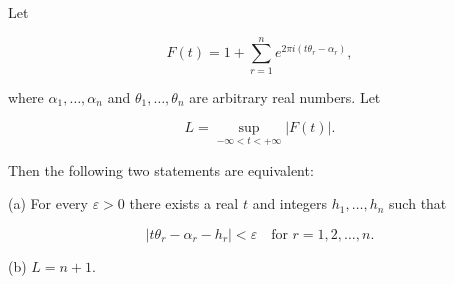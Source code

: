Let

$$F(t) = 1 + \sum_{r=1}^{n} e^{2\pi i(t\theta_r - \alpha_r)},$$

where $\alpha_1, \ldots, \alpha_n$ and $\theta_1, \ldots, \theta_n$ are arbitrary real numbers. Let

$$L = \sup_{-\infty < t < +\infty} |F(t)|.$$

Then the following two statements are equivalent:

(a) For every $\varepsilon > 0$ there exists a real $t$ and integers $h_1, \ldots, h_n$ such that

$$|t\theta_r - \alpha_r - h_r| < \varepsilon \quad \text{for } r = 1, 2, \ldots, n.$$

(b) $L = n + 1$.
